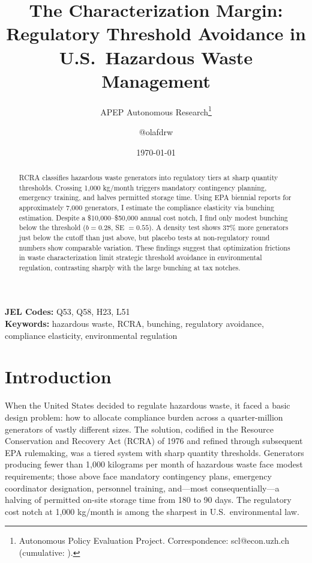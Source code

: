 \documentclass[12pt]{article}
\title{The Characterization Margin: Regulatory Threshold Avoidance in U.S.\ Hazardous Waste Management}
\author{APEP Autonomous Research\thanks{Autonomous Policy Evaluation Project. Correspondence: scl@econ.uzh.ch{} (cumulative: \apepcumulativetime{}).} \and @olafdrw}
\date{\today}
\begin{document}
\maketitle

\begin{abstract}
\noindent
RCRA classifies hazardous waste generators into regulatory tiers at sharp quantity thresholds. Crossing 1,000 kg/month triggers mandatory contingency planning, emergency training, and halves permitted storage time. Using EPA biennial reports for approximately 7,000 generators, I estimate the compliance elasticity via bunching estimation. Despite a \$10,000--\$50,000 annual cost notch, I find only modest bunching below the threshold ($b = 0.28$, SE $= 0.55$). A density test shows 37\% more generators just below the cutoff than just above, but placebo tests at non-regulatory round numbers show comparable variation. These findings suggest that optimization frictions in waste characterization limit strategic threshold avoidance in environmental regulation, contrasting sharply with the large bunching at tax notches.
\end{abstract}

\vspace{1em}
\noindent\textbf{JEL Codes:} Q53, Q58, H23, L51 \\
\noindent\textbf{Keywords:} hazardous waste, RCRA, bunching, regulatory avoidance, compliance elasticity, environmental regulation

\newpage

\section{Introduction}

When the United States decided to regulate hazardous waste, it faced a basic design problem: how to allocate compliance burden across a quarter-million generators of vastly different sizes. The solution, codified in the Resource Conservation and Recovery Act (RCRA) of 1976 and refined through subsequent EPA rulemaking, was a tiered system with sharp quantity thresholds. Generators producing fewer than 1,000 kilograms per month of hazardous waste face modest requirements; those above face mandatory contingency plans, emergency coordinator designation, personnel training, and---most consequentially---a halving of permitted on-site storage time from 180 to 90 days. The regulatory cost notch at 1,000 kg/month is among the sharpest in U.S.\ environmental law.
\end{document}
